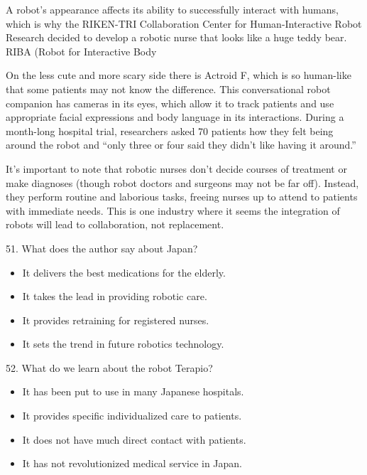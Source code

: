 \documentclass[UTF8,11pt]{ctexart}
\begin{document}
A robot's appearance affects its ability to successfully interact with humans, which is why the RIKEN-TRI Collaboration Center for Human-Interactive Robot Research decided to develop a robotic nurse that looks like a huge teddy bear. RIBA (Robot for Interactive Body


On the less cute and more scary side there is Actroid F, which is so human-like that some patients may not know the difference. This conversational robot companion has cameras in its eyes, which allow it to track patients and use appropriate facial expressions and body language in its interactions. During a month-long hospital trial, researchers asked 70 patients how they felt being around the robot and “only three or four said they didn't like having it around.”


It's important to note that robotic nurses don't decide courses of treatment or make diagnoses (though robot doctors and surgeons may not be far off). Instead, they perform routine and laborious tasks, freeing nurses up to attend to patients with immediate needs. This is one industry where it seems the integration of robots will lead to collaboration, not replacement.


51. What does the author say about Japan?


\begin{itemize}[leftmargin=2em,itemsep=.2em,topsep=.4em]\item[A.] It delivers the best medications for the elderly.
\item[B.] It takes the lead in providing robotic care.
\item[C.] It provides retraining for registered nurses.
\end{itemize}

\begin{itemize}[leftmargin=2em,itemsep=.2em,topsep=.4em]\item[D.] It sets the trend in future robotics technology.
\end{itemize}

52. What do we learn about the robot Terapio?


\begin{itemize}[leftmargin=2em,itemsep=.2em,topsep=.4em]\item[A.] It has been put to use in many Japanese hospitals.
\item[B.] It provides specific individualized care to patients.
\item[C.] It does not have much direct contact with patients.
\item[D.] It has not revolutionized medical service in Japan.
\end{itemize}
\end{document}
